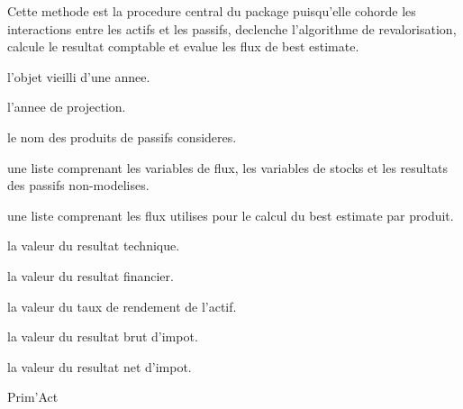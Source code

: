 \documentclass[a4paper]{book}
\begin{document}
%
\begin{Details}\relax
Cette methode est la procedure central du package  puisqu'elle cohorde les interactions entre
les actifs et les passifs, declenche l'algorithme de revalorisation, calcule le resultat comptable et evalue les 
flux de best estimate.
\end{Details}
%
\begin{Value}
 l'objet   vieilli d'une annee.

 l'annee de projection.

 le nom des produits de passifs consideres.

 une liste comprenant les variables de flux, les variables de stocks et les resultats
des passifs non-modelises.

 une liste comprenant les flux utilises pour le calcul du best estimate par produit.

 la valeur du resultat technique.

 la valeur du resultat financier.

 la valeur du taux de rendement de l'actif.

 la valeur du resultat brut d'impot.

 la valeur du resultat net d'impot.
\end{Value}
%
\begin{Author}\relax
Prim'Act
\end{Author}
%
\end{document}

